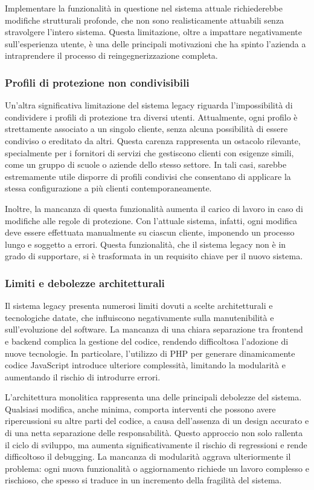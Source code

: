Implementare la funzionalità in questione nel sistema attuale richiederebbe modifiche strutturali profonde, che non sono realisticamente attuabili senza stravolgere l’intero sistema. Questa limitazione, oltre a impattare negativamente sull'esperienza utente, è una delle principali motivazioni che ha spinto l'azienda a intraprendere il processo di reingegnerizzazione completa.

\subsubsection{Profili di protezione non condivisibili}

Un’altra significativa limitazione del sistema legacy riguarda l’impossibilità di condividere i profili di protezione tra diversi utenti. Attualmente, ogni profilo è strettamente associato a un singolo cliente, senza alcuna possibilità di essere condiviso o ereditato da altri. Questa carenza rappresenta un ostacolo rilevante, specialmente per i fornitori di servizi che gestiscono clienti con esigenze simili, come un gruppo di scuole o aziende dello stesso settore. In tali casi, sarebbe estremamente utile disporre di profili condivisi che consentano di applicare la stessa configurazione a più clienti contemporaneamente.

Inoltre, la mancanza di questa funzionalità aumenta il carico di lavoro in caso di modifiche alle regole di protezione. Con l’attuale sistema, infatti, ogni modifica deve essere effettuata manualmente su ciascun cliente, imponendo un processo lungo e soggetto a errori. Questa funzionalità, che il sistema legacy non è in grado di supportare, si è trasformata in un requisito chiave per il nuovo sistema.

\subsubsection{Limiti e debolezze architetturali}
Il sistema legacy presenta numerosi limiti dovuti a scelte architetturali e tecnologiche datate, che influiscono negativamente sulla manutenibilità e sull'evoluzione del software. La mancanza di una chiara separazione tra frontend e backend complica la gestione del codice, rendendo difficoltosa l’adozione di nuove tecnologie. In particolare, l’utilizzo di PHP per generare dinamicamente codice JavaScript introduce ulteriore complessità, limitando la modularità e aumentando il rischio di introdurre errori.

L’architettura monolitica rappresenta una delle principali debolezze del sistema. Qualsiasi modifica, anche minima, comporta interventi che possono avere ripercussioni su altre parti del codice, a causa dell’assenza di un design accurato e di una netta separazione delle responsabilità. Questo approccio non solo rallenta il ciclo di sviluppo, ma aumenta significativamente il rischio di regressioni e rende difficoltoso il debugging. La mancanza di modularità aggrava ulteriormente il problema: ogni nuova funzionalità o aggiornamento richiede un lavoro complesso e rischioso, che spesso si traduce in un incremento della fragilità del sistema.

